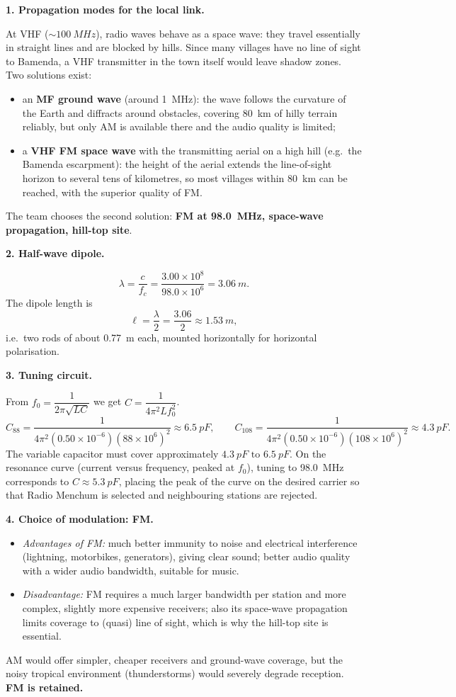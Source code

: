 \documentclass[11pt]{article}
\newcommand{\cle}[1]{{\popxbold\color{popdark}#1}}
\newcounter{popsec}
\newcounter{popsub}
\newcommand{\courssub}[1]{%
  \stepcounter{popsub}%
  \par\vspace{9pt}\noindent{\popxbold\fontsize{11.5}{13}\selectfont\color{popink}{\color{poporange}\thepopsec.\thepopsub}\hspace{6pt}#1}\par\nopagebreak\vspace{4pt}
}
\begin{document}
\courssub{Model answer}

\textbf{1. Propagation modes for the local link.}\par
At VHF ($\sim\SI{100}{MHz}$), radio waves behave as a \cle{space wave}: they travel essentially in straight lines and are blocked by hills. Since many villages have no line of sight to Bamenda, a VHF transmitter in the town itself would leave shadow zones. Two solutions exist:
\begin{itemize}
\item an \textbf{MF ground wave} (around \SI{1}{MHz}): the wave follows the curvature of the Earth and diffracts around obstacles, covering \SI{80}{km} of hilly terrain reliably, but only AM is available there and the audio quality is limited;
\item a \textbf{VHF FM space wave} with the transmitting aerial on a high hill (e.g.\ the Bamenda escarpment): the height of the aerial extends the line-of-sight horizon to several tens of kilometres, so most villages within \SI{80}{km} can be reached, with the superior quality of FM.
\end{itemize}
The team chooses the second solution: \textbf{FM at \SI{98.0}{MHz}, space-wave propagation, hill-top site}.

\textbf{2. Half-wave dipole.}\par
\[
\lambda = \frac{c}{f_c} = \frac{3.00\times 10^{8}}{98.0\times 10^{6}} = \SI{3.06}{m}.
\]
The dipole length is
\[
\ell = \frac{\lambda}{2} = \frac{3.06}{2} \approx \SI{1.53}{m},
\]
i.e.\ two rods of about \SI{0.77}{m} each, mounted horizontally for horizontal polarisation.

\textbf{3. Tuning circuit.}\par
From $f_0 = \dfrac{1}{2\pi\sqrt{LC}}$ we get $C = \dfrac{1}{4\pi^{2} L f_0^{2}}$.
\[
C_{88} = \frac{1}{4\pi^{2}(0.50\times10^{-6})(88\times10^{6})^{2}} \approx \SI{6.5}{pF},
\qquad
C_{108} = \frac{1}{4\pi^{2}(0.50\times10^{-6})(108\times10^{6})^{2}} \approx \SI{4.3}{pF}.
\]
The variable capacitor must cover approximately $\boxed{\SI{4.3}{pF} \text{ to } \SI{6.5}{pF}}$. On the resonance curve (current versus frequency, peaked at $f_0$), tuning to \SI{98.0}{MHz} corresponds to $C \approx \SI{5.3}{pF}$, placing the peak of the curve on the desired carrier so that Radio Menchum is selected and neighbouring stations are rejected.

\textbf{4. Choice of modulation: FM.}\par
\begin{itemize}
\item \emph{Advantages of FM:} much better immunity to noise and electrical interference (lightning, motorbikes, generators), giving clear sound; better audio quality with a wider audio bandwidth, suitable for music.
\item \emph{Disadvantage:} FM requires a much larger bandwidth per station and more complex, slightly more expensive receivers; also its space-wave propagation limits coverage to (quasi) line of sight, which is why the hill-top site is essential.
\end{itemize}
AM would offer simpler, cheaper receivers and ground-wave coverage, but the noisy tropical environment (thunderstorms) would severely degrade reception. \textbf{FM is retained.}
\end{document}
